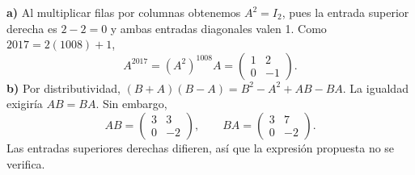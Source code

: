 \textbf{a)} Al multiplicar filas por columnas obtenemos
$A^2=I_2$, pues la entrada superior derecha es $2-2=0$
y ambas entradas diagonales valen 1. Como $2017=2(1008)+1$,
\[
A^{2017}=(A^2)^{1008}A=\boxed{\begin{pmatrix}1&2\\0&-1\end{pmatrix}}.
\]
\textbf{b)} Por distributividad,
$(B+A)(B-A)=B^2-A^2+AB-BA$. La igualdad exigiría $AB=BA$.
Sin embargo,
\[
AB=\begin{pmatrix}3&3\\0&-2\end{pmatrix},\qquad
BA=\begin{pmatrix}3&7\\0&-2\end{pmatrix}.
\]
Las entradas superiores derechas difieren, así que la expresión
propuesta no se verifica.
